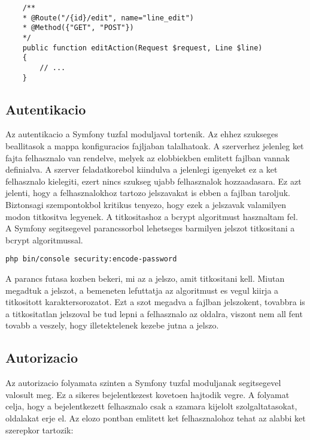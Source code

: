 \begin{lstlisting}
    /**
    * @Route("/{id}/edit", name="line_edit")
    * @Method({"GET", "POST"})
    */
    public function editAction(Request $request, Line $line)
    {
        // ...
    }
\end{lstlisting}

\subsection*{Autentikacio}
\label{authentication}

Az autentikacio a Symfony tuzfal moduljaval tortenik. 
Az ehhez szukseges beallitasok a  mappa  konfiguracios fajljaban talalhatoak. 
A szerverhez jelenleg ket fajta felhasznalo van rendelve, melyek az elobbiekben emlitett fajlban vannak definialva.
A szerver feladatkorebol kiindulva a jelenlegi igenyeket ez a ket felhasznalo kielegiti, ezert nincs szukseg ujabb felhasznalok hozzaadasara. 
Ez azt jelenti, hogy a felhasznalokhoz tartozo jelszavakat is ebben a fajlban taroljuk. 
Biztonsagi szempontokbol kritikus tenyezo, hogy ezek a jelszavak valamilyen modon titkositva legyenek. 
A titkositashoz a bcrypt algoritmust hasznaltam fel. 
A Symfony segitsegevel parancssorbol lehetseges barmilyen jelszot titkositani a bcrypt algoritmussal. 

\begin{lstlisting}
php bin/console security:encode-password
\end{lstlisting}

A parancs futasa kozben bekeri, mi az a jelszo, amit titkositani kell. 
Miutan megadtuk a jelszot, a bemeneten lefuttatja az algoritmust es vegul kiirja a titkositott karaktersorozatot. 
Ezt a szot megadva a fajlban jelszokent, tovabbra is a titkositatlan jelszoval be tud lepni a felhasznalo az oldalra, viszont nem all fent tovabb a veszely, hogy illetektelenek kezebe jutna a jelszo. 

\subsection*{Autorizacio}
\label{authorization}

Az autorizacio folyamata szinten a Symfony tuzfal moduljanak segitsegevel valosult meg. 
Ez a sikeres bejelentkezest kovetoen hajtodik vegre. 
A folyamat celja, hogy a bejelentkezett felhasznalo csak a szamara kijelolt szolgaltatasokat, oldalakat erje el. 
Az elozo pontban emlitett ket felhasznalohoz tehat az alabbi ket szerepkor tartozik:

